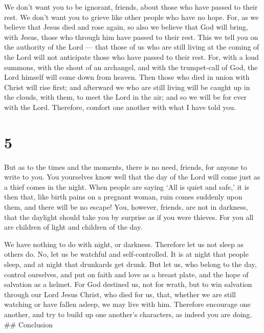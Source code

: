  We don't want you to be ignorant, friends, about those who
have passed to their rest. We don't want you to grieve like other people
who have no hope.  For, as we believe that Jesus died and
rose again, so also we believe that God will bring, with Jesus, those
who through him have passed to their rest.  This we tell
you on the authority of the Lord --- that those of us who are still
living at the coming of the Lord will not anticipate those who have
passed to their rest.  For, with a loud summons, with the
shout of an archangel, and with the trumpet-call of God, the Lord
himself will come down from heaven.  Then those who died in
union with Christ will rise first; and afterward we who are still living
will be caught up in the clouds, with them, to meet the Lord in the air;
and so we will be for ever with the Lord.  Therefore,
comfort one another with what I have told you.

\hypertarget{section-4}{%
\section{5}\label{section-4}}

 But as to the times and the moments, there is no need,
friends, for anyone to write to you.  You yourselves know
well that the day of the Lord will come just as a thief comes in the
night.  When people are saying `All is quiet and safe,' it
is then that, like birth pains on a pregnant woman, ruin comes suddenly
upon them, and there will be no escape!  You, however,
friends, are not in darkness, that the daylight should take you by
surprise as if you were thieves.  For you all are children
of light and children of the day.

We have nothing to do with night, or darkness.  Therefore
let us not sleep as others do. No, let us be watchful and
self-controlled.  It is at night that people sleep, and at
night that drunkards get drunk.  But let us, who belong to
the day, control ourselves, and put on faith and love as a breast plate,
and the hope of salvation as a helmet.  For God destined us,
not for wrath, but to win salvation through our Lord Jesus Christ, who
died for us,  that, whether we are still watching or have
fallen asleep, we may live with him.  Therefore encourage
one another, and try to build up one another's characters, as indeed you
are doing. \#\# Conclusion

